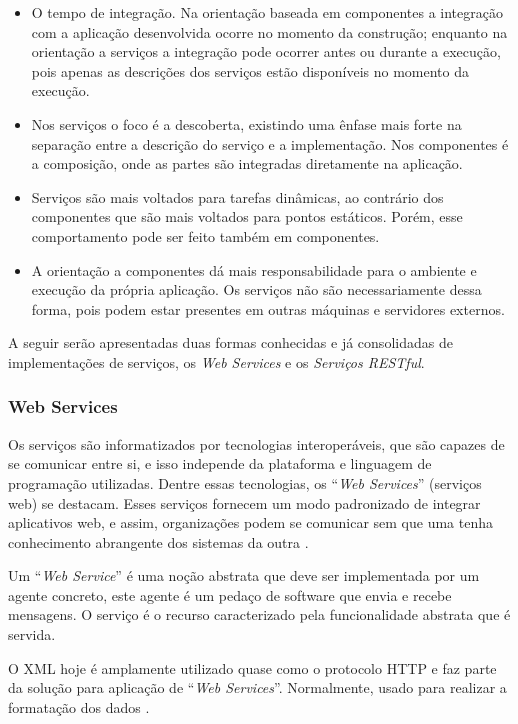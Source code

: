 \begin{itemize}
	\item O tempo de integração. Na orientação baseada em componentes a integração com a aplicação desenvolvida ocorre no momento da construção; enquanto na orientação a serviços a integração pode ocorrer antes ou durante a execução, pois apenas as descrições dos serviços estão disponíveis no momento da execução.
	\item Nos serviços o foco é a descoberta, existindo uma ênfase mais forte na separação entre a descrição do serviço e a implementação. Nos componentes é a composição, onde as partes são integradas diretamente na aplicação.
	\item Serviços são mais voltados para tarefas dinâmicas, ao contrário dos componentes que são mais voltados para pontos estáticos. Porém, esse comportamento pode ser feito também em componentes.
	\item A orientação a componentes dá mais responsabilidade para o ambiente e execução da própria aplicação. Os serviços não são necessariamente dessa forma, pois podem estar presentes em outras máquinas e servidores externos.
\end{itemize}

A seguir serão apresentadas duas formas conhecidas e já consolidadas de implementações de serviços, os \textit{Web Services} e os \textit{Serviços RESTful}.

\subsubsection{Web Services}

Os serviços são informatizados por tecnologias interoperáveis, que são capazes de se comunicar entre si, e isso independe da plataforma e linguagem de programação utilizadas. Dentre essas tecnologias, os ``\textit{Web Services}'' (serviços web) se destacam. Esses serviços fornecem um modo padronizado de integrar aplicativos web, e assim, organizações podem se comunicar sem que uma tenha conhecimento abrangente dos sistemas da outra \cite{Victorino:Brascher:2009}.

Um ``\textit{Web Service}'' é uma noção abstrata que deve ser implementada por um agente concreto, este agente é um pedaço de software que envia e recebe mensagens. O serviço é o recurso caracterizado pela funcionalidade abstrata que é servida.

O XML hoje é amplamente utilizado quase como o protocolo HTTP e faz parte da solução para aplicação de ``\textit{Web Services}''. Normalmente, usado para realizar a formatação dos dados \cite{Alonso:Casati:Kuno:Machiraju:2010}.

